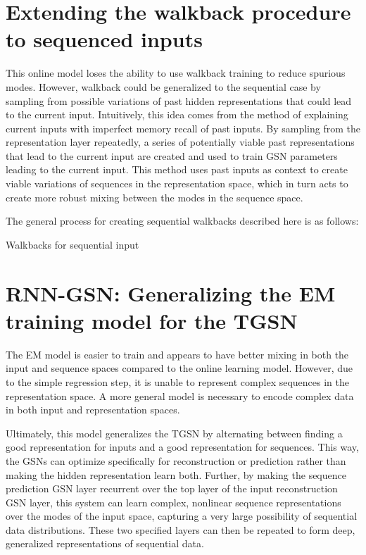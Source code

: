 \section{Extending the walkback procedure to sequenced inputs}

This online model loses the ability to use walkback training to reduce spurious modes. However, walkback could be generalized to the sequential case by sampling from possible variations of past hidden representations that could lead to the current input. Intuitively, this idea comes from the method of explaining current inputs with imperfect memory recall of past inputs. By sampling from the representation layer repeatedly, a series of potentially viable past representations that lead to the current input are created and used to train GSN parameters leading to the current input. This method uses past inputs as context to create viable variations of sequences in the representation space, which in turn acts to create more robust mixing between the modes in the sequence space.

The general process for creating sequential walkbacks described here is as follows:
\begin{algorithm}[h!]
	\caption{ Walkbacks for sequential input }
\end{algorithm}

\section{RNN-GSN: Generalizing the EM training model for the TGSN}
The EM model is easier to train and appears to have better mixing in both the input and sequence spaces compared to the online learning model. However, due to the simple regression step, it is unable to represent complex sequences in the representation space. A more general model is necessary to encode complex data in both input and representation spaces.

Ultimately, this model generalizes the TGSN by alternating between finding a good representation for inputs and a good representation for sequences. This way, the GSNs can optimize specifically for reconstruction or prediction rather than making the hidden representation learn both. Further, by making the sequence prediction GSN layer recurrent over the top layer of the input reconstruction GSN layer, this system can learn complex, nonlinear sequence representations over the modes of the input space, capturing a very large possibility of sequential data distributions. These two specified layers can then be repeated to form deep, generalized representations of sequential data.

